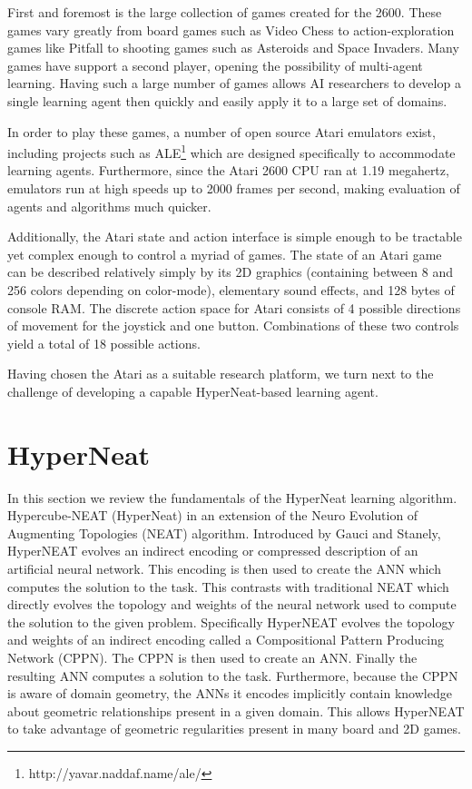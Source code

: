 \documentclass{acm_proc_article-sp}
\begin{document}
First and foremost is the large collection of games created for the 2600. These games vary greatly from board games such as Video Chess to action-exploration games like Pitfall to shooting games such as Asteroids and Space Invaders. Many games have support a second player, opening the possibility of multi-agent learning. Having such a large number of games allows AI researchers to develop a single learning agent then quickly and easily apply it to a large set of domains.

In order to play these games, a number of open source Atari emulators exist, including projects such as ALE\footnote{http://yavar.naddaf.name/ale/} which are designed specifically to accommodate learning agents. Furthermore, since the Atari 2600 CPU ran at 1.19 megahertz, emulators run at high speeds up to 2000 frames per second, making evaluation of agents and algorithms much quicker.

Additionally, the Atari state and action interface is simple enough to be tractable yet complex enough to control a myriad of games. The state of an Atari game can be described relatively simply by its 2D graphics (containing between 8 and 256 colors depending on color-mode), elementary sound effects, and 128 bytes of console RAM. The discrete action space for Atari consists of 4 possible directions of movement for the joystick and one button. Combinations of these two controls yield a total of 18 possible actions.

Having chosen the Atari as a suitable research platform, we turn next to the challenge of developing a capable HyperNeat-based learning agent.

\section{HyperNeat}
\label{sec:hyperneat}
In this section we review the fundamentals of the HyperNeat learning algorithm. Hypercube-NEAT (HyperNeat) in an extension of the Neuro Evolution of Augmenting Topologies (NEAT) algorithm\cite{stanley02}. Introduced by Gauci and Stanely\cite{gauci08}, HyperNEAT evolves an indirect encoding or compressed description of an artificial neural network. This encoding is then used to create the ANN which computes the solution to the task. This contrasts with traditional NEAT which directly evolves the topology and weights of the neural network used to compute the solution to the given problem. Specifically HyperNEAT evolves the topology and weights of an indirect encoding called a Compositional Pattern Producing Network (CPPN). The CPPN is then used to create an ANN. Finally the resulting ANN computes a solution to the task. Furthermore, because the CPPN is aware of domain geometry, the ANNs it encodes implicitly contain knowledge about geometric relationships present in a given domain. This allows HyperNEAT to take advantage of geometric regularities present in many board and 2D games.
\end{document}
